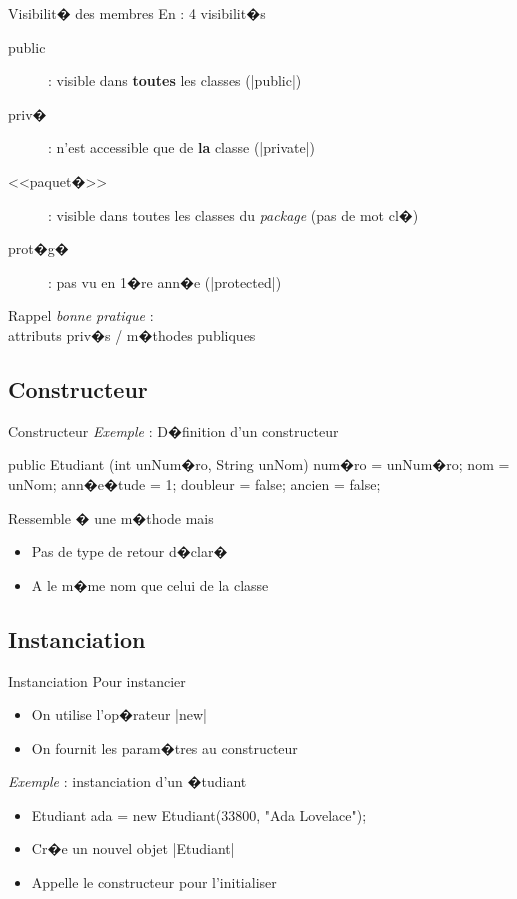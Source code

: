 \begin{frame}{Visibilit� des membres}
En  : 4 visibilit�s
\begin{description}
  \item[public] : visible dans \textbf{toutes} les classes (\java|public|)
  \item[priv�] : n'est accessible que de \textbf{la} classe (\java|private|)
  \item[<<paquet�>>] : visible dans toutes les classes du \textit{package} (pas de mot cl�)
  \item[prot�g�] : pas vu en 1�re ann�e (\java|protected|)
\end{description}
\bigskip
Rappel \emph{bonne pratique} :
\\attributs priv�s / m�thodes publiques
\end{frame}

\subsection{Constructeur}

\begin{frame}[fragile]{Constructeur}
\emph{Exemple} : D�finition d'un constructeur
  \begin{Java}
  public Etudiant (int unNum�ro, String unNom) {
    num�ro = unNum�ro;
    nom = unNom;
    ann�e�tude = 1;
    doubleur = false;
    ancien = false;
  }
  \end{Java}
  Ressemble � une m�thode mais
  \begin{itemize}
    \item Pas de type de retour d�clar�
    \item A le m�me nom que celui de la classe
  \end{itemize}
\end{frame}

\subsection{Instanciation}

\begin{frame}[fragile]{Instanciation}
Pour instancier 
\begin{itemize}
\item On utilise l'op�rateur \java|new|
\item On fournit les param�tres au constructeur
\end{itemize}
\medskip
\emph{Exemple} : instanciation d'un �tudiant
\begin{itemize}
\item[]
\begin{Java}
Etudiant ada = new Etudiant(33800, "Ada Lovelace");
\end{Java}
\item Cr�e un nouvel objet \java|Etudiant|
\item Appelle le constructeur pour l'initialiser
\end{itemize}
\end{frame}

